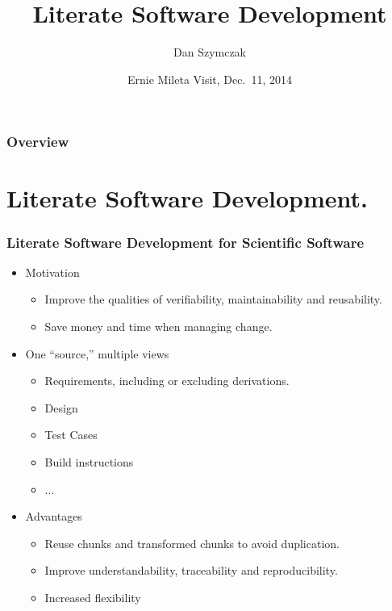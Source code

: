 \documentclass{beamer}
\title[\pgfuseimage{logo}]  %
{Literate Software Development}
\author[Slide \thepage~of \pageref{TotPages}] %
{Dan Szymczak}
\institute[McMaster University] %
{
  Computing and Software Department\\
  Faculty of Engineering\\
  McMaster University
}
\date[Dec 11, 2014] %
{Ernie Mileta Visit, Dec.\ 11, 2014}
\begin{document}
\begin{frame}

\titlepage

\end{frame}


\begin{frame}

\frametitle{Overview}
\tableofcontents


\end{frame}


\section[Literate Software]{Literate Software Development.}



\begin{frame}

\frametitle{Literate Software Development for Scientific Software}

\begin{itemize}
\item Motivation
\begin{itemize}
\item Improve the qualities of verifiability, maintainability and reusability.
\item Save money and time when managing change.
\end{itemize}
\item One ``source,'' multiple views
\begin{itemize}
\item Requirements, including or excluding derivations.
\item Design
\item Test Cases
\item Build instructions
\item ...
\end{itemize}
\item Advantages
\begin{itemize}
\item Reuse chunks and transformed chunks to avoid duplication.
\item Improve understandability, traceability and reproducibility.
\item Increased flexibility
\end{itemize}
\end{itemize}
\end{frame}
\end{document}
